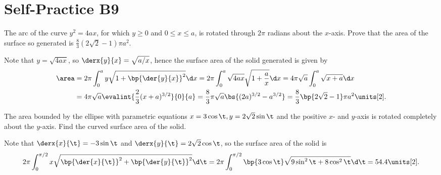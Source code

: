 \section{Self-Practice B9}

\begin{problem}
    The arc of the curve $y^{2}=4ax$, for which $y\geq0$ and $0\leq x\leq a$, is rotated through $2\pi$ radians about the $x$-axis. Prove that the area of the surface so generated is $\frac83 (2\sqrt2 - 1) \pi a^2$.
\end{problem}
\begin{solution}
    Note that $y = \sqrt{4ax}$, so $\derx{y}{x} = \sqrt{a/x}$, hence the surface area of the solid generated is given by
    \begin{align*}
        \area &= 2\pi \int_0^a y \sqrt{1 + \bp{\der{y}{x}}^2} \d x = 2\pi \int_0^a \sqrt{4ax} \sqrt{1 + \frac{a}{x}} \d x = 4\pi \sqrt{a} \int_0^a \sqrt{x + a} \d x\\
        &= 4\pi \sqrt{a} \evalint{\frac23 (x+a)^{3/2}}{0}{a} = \frac{8}{3} \pi \sqrt{a} \bs{(2a)^{3/2} - a^{3/2}} = \frac{8}{3} \bp{2\sqrt2 - 1}\pi a^2 \units[2].
    \end{align*}
\end{solution}

\begin{problem}
    The area bounded by the ellipse with parametric equations $x=3\cos\t,y=2\sqrt{2}\sin\t$ and the positive $x$- and $y$-axis is rotated completely about the $y$-axis. Find the curved surface area of the solid.
\end{problem}
\begin{solution}
    Note that $\derx{x}{\t} = -3\sin\t$ and $\derx{y}{\t} = 2\sqrt2 \cos \t$, so the surface area of the solid is \[2\pi \int_{0}^{\pi/2} x \sqrt{\bp{\der{x}{\t}}^2 + \bp{\der{y}{\t}}^2} \d \t = 2\pi \int_0^{\pi/2} \bp{3\cos \t} \sqrt{9\sin^2 \t + 8 \cos^2 \t} \d \t = 54.4 \units[2].\]
\end{solution}

